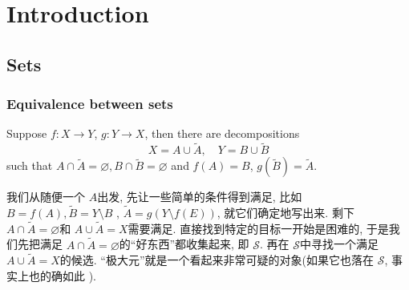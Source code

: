 \documentclass[../main.tex]{subfiles}
\begin{document}
\ifSubfilesClassLoaded{

    \tableofcontents
    
}{}

\chapter{Introduction }

\section{Sets}

\subsection{Equivalence between sets}

\begin{lemma}{}{}
    Suppose \(  f:X\to Y  \), \(  g:Y\to X  \), then there are decompositions \[
    X= A\cup \tilde{A},\quad Y= B\cup \tilde{B}
    \]such that \(  A\cap \tilde{A}= \varnothing, B\cap \tilde{B}= \varnothing  \) and \(  f\left( A \right)= B   \), \(  g\left( \tilde{B} \right)= \tilde{A}  \).     
\end{lemma}

\begin{note}
    我们从随便一个 \(  A  \)出发, 先让一些简单的条件得到满足, 比如 \(  B= f\left( A \right), \tilde{B}= Y\setminus B   \) , \(  \tilde{A}= g\left( Y\setminus f\left( E \right)  \right)   \), 就它们确定地写出来. 剩下 \(  A\cap \tilde{A} = \varnothing \)和 \(  A\cup \tilde{A}= X  \)需要满足.   直接找到特定的目标一开始是困难的, 于是我们先把满足 \(  A\cap \tilde{A}= \varnothing  \)的``好东西''都收集起来, 即 \(  \mathcal{S}  \). 再在 \(  \mathcal{S}  \)中寻找一个满足 \(  A\cup \tilde{A}= X  \)的候选. ``极大元''就是一个看起来非常可疑的对象(如果它也落在 \(  \mathcal{S}  \), 事实上也的确如此 ). 
\end{note}
\end{document}
